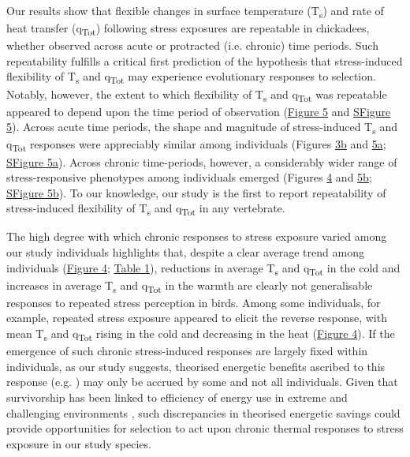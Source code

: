 \documentclass[12pt]{article}
\begin{document}
\noindent Our results show that flexible changes in surface temperature (T\textsubscript{s}) and rate of heat transfer (q\textsubscript{Tot}) following stress exposures are repeatable in chickadees, whether observed across acute or protracted (i.e. chronic) time periods. Such repeatability fulfills a critical first prediction of the hypothesis that stress-induced flexibility of T\textsubscript{s} and q\textsubscript{Tot} may experience evolutionary responses to selection. Notably, however, the extent to which flexibility of T\textsubscript{s} and q\textsubscript{Tot} was repeatable appeared to depend upon the time period of observation (\hyperref[Fig4.5]{Figure 5} and \hyperref[FigC.5]{SFigure 5}). Across acute time periods, the shape and magnitude of stress-induced T\textsubscript{s} and q\textsubscript{Tot} responses were appreciably similar among individuals (Figures \hyperref[Fig4.3]{3b} and \hyperref[Fig4.5]{5a}; \hyperref[FigC.5]{SFigure 5a}). Across chronic time-periods, however, a considerably wider range of stress-responsive phenotypes among individuals emerged (Figures \hyperref[Fig4.4]{4} and \hyperref[Fig4.5]{5b}; \hyperref[FigC.5]{SFigure 5b}). To our knowledge, our study is the first to report repeatability of stress-induced flexibility of T\textsubscript{s} and q\textsubscript{Tot} in any vertebrate. \vspace{1cm}

\noindent The high degree with which chronic responses to stress exposure varied among our study individuals highlights that, despite a clear average trend among individuals (\hyperref[Fig4.4]{Figure 4}; \hyperref[Tab4.1]{Table 1}), reductions in average T\textsubscript{s} and q\textsubscript{Tot} in the cold and increases in average T\textsubscript{s} and q\textsubscript{Tot} in the warmth are clearly not generalisable responses to repeated stress perception in birds. Among some individuals, for example, repeated stress exposure appeared to elicit the reverse response, with mean T\textsubscript{s} and q\textsubscript{Tot} rising in the cold and decreasing in the heat (\hyperref[Fig4.4]{Figure 4}). If the emergence of such chronic stress-induced responses are largely fixed within individuals, as our study suggests, theorised energetic benefits ascribed to this response (e.g. \citealt{robertson_2020b,jerem_2018,herborn_2018}) may only be accrued by some and not all individuals. Given that survivorship has been linked to efficiency of energy use in extreme and challenging environments \citep{parsons_2005}, such discrepancies in theorised energetic savings could provide opportunities for selection to act upon chronic thermal responses to stress exposure in our study species. \vspace{1cm}
\end{document}
